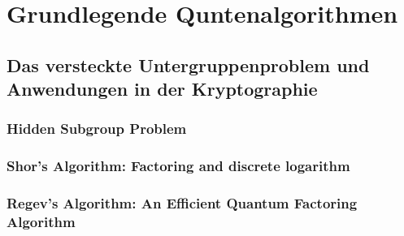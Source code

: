 \chapter{Grundlegende Quntenalgorithmen}
\label{basic_algorithms} %



\section{Das versteckte Untergruppenproblem und Anwendungen in der Kryptographie}
\subsection{Hidden Subgroup Problem}
\subsection{Shor’s Algorithm: Factoring and discrete logarithm}
\subsection{Regev’s Algorithm: An Efficient Quantum Factoring Algorithm}

\printbibliography

